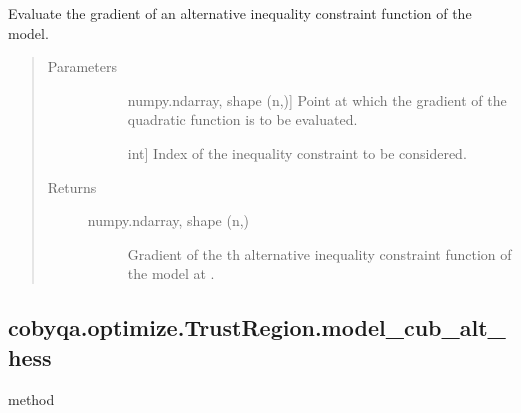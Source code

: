 \documentclass[letterpaper,10pt,english]{sphinxmanual}
\begin{document}
\begin{fulllineitems}
\begin{fulllineitems}
\label{\detokenize{refs/generated/cobyqa.optimize.TrustRegion.model_cub_alt_grad:cobyqa.optimize.TrustRegion.model_cub_alt_grad}}
\sphinxAtStartPar
Evaluate the gradient of an alternative inequality constraint function
of the model.
\begin{quote}\begin{description}
\item[{Parameters}] \leavevmode\begin{description}
\item[{}] \leavevmode{[}numpy.ndarray, shape (n,){]}
\sphinxAtStartPar
Point at which the gradient of the quadratic function is to be
evaluated.

\item[{}] \leavevmode{[}int{]}
\sphinxAtStartPar
Index of the inequality constraint to be considered.

\end{description}

\item[{Returns}] \leavevmode\begin{description}
\item[{numpy.ndarray, shape (n,)}] \leavevmode
\sphinxAtStartPar
Gradient of the \sphinxhyphen{}th alternative inequality constraint function of
the model at .

\end{description}

\end{description}\end{quote}

\end{fulllineitems}



\subsection{cobyqa.optimize.TrustRegion.model\_cub\_alt\_hess}
\label{\detokenize{refs/generated/cobyqa.optimize.TrustRegion.model_cub_alt_hess:cobyqa-optimize-trustregion-model-cub-alt-hess}}\label{\detokenize{refs/generated/cobyqa.optimize.TrustRegion.model_cub_alt_hess::doc}}
\sphinxAtStartPar
method


\end{fulllineitems}
\end{document}
